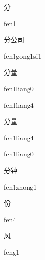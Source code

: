 \begin{verbete}[fen1]{分}
\begin{pronuncia}{fen1}
\end{pronuncia}
\end{verbete}

\begin{verbete}{分公司}
\begin{pronuncia}{fen1gong1si1}
\end{pronuncia}
\end{verbete}

\begin{verbete}{分量}
\begin{pronuncia}{fen1liang0}
\end{pronuncia}
\begin{pronuncia}{fen1liang4}
\end{pronuncia}
\end{verbete}

\begin{verbete}{分量}
\begin{pronuncia}{fen1liang4}
\end{pronuncia}
\begin{pronuncia}{fen1liang0}
\end{pronuncia}
\end{verbete}

\begin{verbete}{分钟}
\begin{pronuncia}{fen1zhong1}
\end{pronuncia}
\end{verbete}

\begin{verbete}[fen4]{份}
\begin{pronuncia}{fen4}
\end{pronuncia}
\end{verbete}

\begin{verbete}[feng1]{风}
\begin{pronuncia}{feng1}
\end{pronuncia}
\end{verbete}

